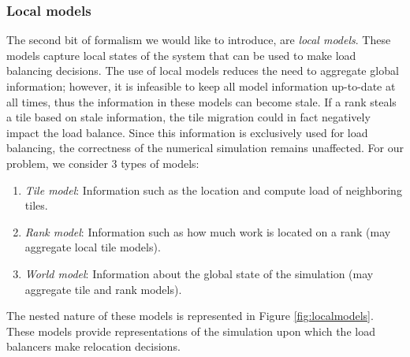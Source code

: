 \subsubsection{Local models}

The second bit of formalism we would like to introduce, are \emph{local models}.  
These models capture local states of the system that can be used to make load balancing decisions.
The use of local models reduces the need to aggregate global information; however, it is infeasible to keep all model information up-to-date at all times, thus the information in these models can become stale.  If a rank steals a tile based on stale information, the tile migration could in fact negatively impact the load balance.
Since this information is exclusively used for load balancing, the correctness of the numerical simulation remains unaffected.
For our problem, we consider 3 types of models:
\begin{enumerate}
\item \emph{Tile model}: Information such as the location and compute load of neighboring tiles.
\item \emph{Rank model}: Information such as how much work is located on a rank (may aggregate local tile models).
\item \emph{World model}: Information about the global state of the simulation (may aggregate tile and rank models).
\end{enumerate}
The nested nature of these models is represented in Figure \ref{fig:localmodels}.
These models provide representations of the simulation upon which the load balancers make relocation decisions.

